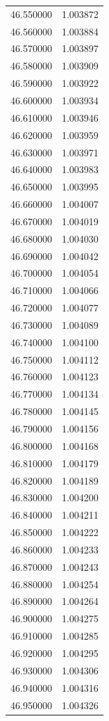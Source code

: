 \begin{tabular}{rr}
46.550000 & 1.003872 \\
46.560000 & 1.003884 \\
46.570000 & 1.003897 \\
46.580000 & 1.003909 \\
46.590000 & 1.003922 \\
46.600000 & 1.003934 \\
46.610000 & 1.003946 \\
46.620000 & 1.003959 \\
46.630000 & 1.003971 \\
46.640000 & 1.003983 \\
46.650000 & 1.003995 \\
46.660000 & 1.004007 \\
46.670000 & 1.004019 \\
46.680000 & 1.004030 \\
46.690000 & 1.004042 \\
46.700000 & 1.004054 \\
46.710000 & 1.004066 \\
46.720000 & 1.004077 \\
46.730000 & 1.004089 \\
46.740000 & 1.004100 \\
46.750000 & 1.004112 \\
46.760000 & 1.004123 \\
46.770000 & 1.004134 \\
46.780000 & 1.004145 \\
46.790000 & 1.004156 \\
46.800000 & 1.004168 \\
46.810000 & 1.004179 \\
46.820000 & 1.004189 \\
46.830000 & 1.004200 \\
46.840000 & 1.004211 \\
46.850000 & 1.004222 \\
46.860000 & 1.004233 \\
46.870000 & 1.004243 \\
46.880000 & 1.004254 \\
46.890000 & 1.004264 \\
46.900000 & 1.004275 \\
46.910000 & 1.004285 \\
46.920000 & 1.004295 \\
46.930000 & 1.004306 \\
46.940000 & 1.004316 \\
46.950000 & 1.004326 \\

\end{tabular}

